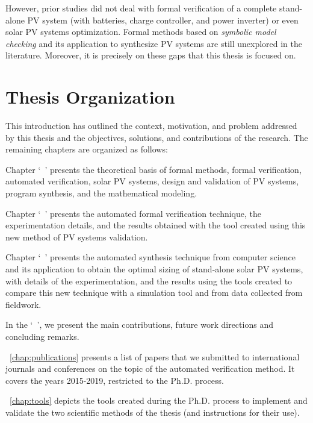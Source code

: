 However, prior studies did not deal with formal verification of a complete stand-alone PV system (with batteries, charge controller, and power inverter) or even solar PV systems optimization. Formal methods based on \textit{symbolic model checking} and its application to synthesize PV systems are still unexplored in the literature. Moreover, it is precisely on these gaps that this thesis is focused on.

\section{Thesis Organization}

This introduction has outlined the context, motivation, and problem addressed by this thesis and the objectives, solutions, and contributions of the research. The remaining chapters are organized as follows:

Chapter `~' presents the theoretical basis of formal methods, formal verification, automated verification, solar PV systems, design and validation of PV systems, program synthesis, and the mathematical modeling. 

Chapter `~' presents the automated formal verification technique, the experimentation details, and the results obtained with the tool created using this new method of PV systems validation. 

Chapter `~' presents the automated synthesis technique from computer science and its application to obtain the optimal sizing of stand-alone solar PV systems, with details of the experimentation, and the results using the tools created to compare this new technique with a simulation tool and from data collected from fieldwork. 

In the `~', we present the main contributions, future work directions and concluding remarks.

~\autoref{chap:publications} presents a list of papers that we submitted to international journals and conferences on the topic of the automated verification method. It covers the years 2015-2019, restricted to the Ph.D. process.

~\autoref{chap:tools} depicts the tools created during the Ph.D. process to implement and validate the two scientific methods of the thesis (and instructions for their use).

